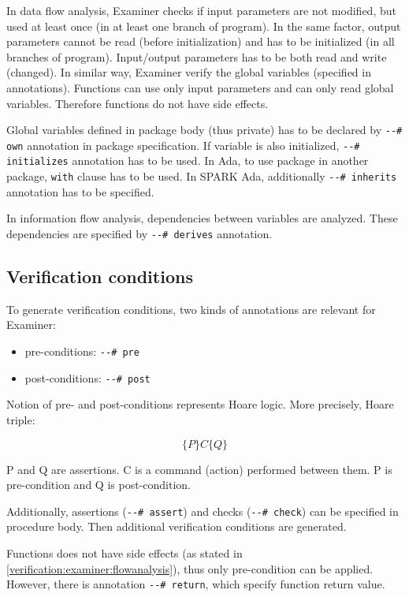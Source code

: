 In data flow analysis, Examiner checks if input parameters are not modified, but used at least once (in at least one branch of program). In the same factor, output parameters cannot be read (before initialization) and has to be initialized (in all branches of program). Input/output parameters has to be both read and write (changed). In similar way, Examiner verify the global variables (specified in annotations). Functions can use only input parameters and can only read global variables. Therefore functions do not have side effects. 

Global variables defined in package body (thus private) has to be declared by \lstinline{--# own} annotation in package specification. If variable is also initialized, \lstinline{--# initializes} annotation has to be used. In Ada, to use package in another package, \lstinline{with} clause has to be used. In SPARK Ada, additionally \lstinline{--# inherits} annotation has to be specified.

In information flow analysis, dependencies between variables are analyzed. These dependencies are specified by \lstinline{--# derives} annotation.


\subsection{Verification conditions}
\label{verification:examiner:vc}

To generate verification conditions, two kinds of annotations are relevant for Examiner:
\begin{itemize}
	\item pre-conditions: \lstinline{--# pre}
	\item post-conditions: \lstinline{--# post}
\end{itemize}

Notion of pre- and post-conditions represents Hoare logic. More precisely, Hoare triple: 

\begin{equation}
	\{P\} C \{Q\}
\end{equation}

P and Q are assertions. C is a command (action) performed between them. P is pre-condition and Q is post-condition.

Additionally, assertions (\lstinline{--# assert}) and checks (\lstinline{--# check}) can be specified in procedure body. Then additional verification conditions are generated.

Functions does not have side effects (as stated in \ref{verification:examiner:flowanalysis}), thus only pre-condition can be applied. However, there is annotation \lstinline{--# return}, which specify function return value.

